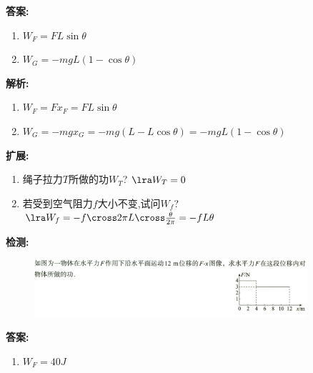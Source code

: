 \documentclass{article}
\begin{document}
\begin{itemize}
\begin{enumerate}
                  \vspace{1em}

                  \textbf{答案:}
                  \begin{enumerate}[label=(\arabic*)]
                      \item $W_{F} = FL\sin{\theta} $
                      \item $W_{G} = -mgL(1-\cos{\theta})$
                  \end{enumerate}

                  \textbf{解析:}
                  \begin{enumerate}[label=(\arabic*)]
                      \item $W_{F} = F x_{F} = F L \sin{\theta} $
                      \item $W_{G} = -mg x_{G} = -mg(L - L \cos{\theta}) = -mgL(1-\cos{\theta})$
                  \end{enumerate}

                  \textbf{扩展:}
                  \begin{enumerate}[label=(\arabic*)]
                      \item 绳子拉力$T$所做的功$W_{T}$? $\lra W_{T} = 0$
                      \item 若受到空气阻力$f$大小不变,试问$W_{f}$? $\lra W_{f} = -f \cross 2\pi L \cross \frac{\theta}{2 \pi} = -fL\theta $
                  \end{enumerate}

                  \vspace{2em}

                  \textbf{检测:}
                  \begin{figure}[h]
                      \centering
                      \includegraphics[width=0.9\textwidth]{pictures/3.png}
                  \end{figure}

                  \vspace{1em}

                  \textbf{答案:}
                  \begin{enumerate}[label=(\arabic*)]
                      \item[] $W_{F} = 40J $
                  \end{enumerate}


\end{enumerate}
\end{itemize}
\end{document}
